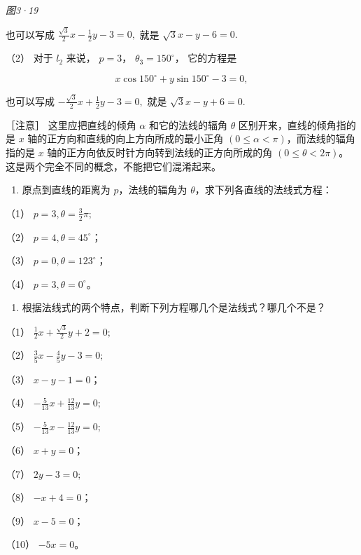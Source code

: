 \emph{图3·19}

也可以写成 \(\frac{\sqrt{3}}{2} x - \frac{1}{2} y - 3 = 0,\) 就是
\(\sqrt{3} x - y - 6 = 0.\)

（2） 对于 \(l_{2}\) 来说， \(p = 3\)， \(\theta_{3} = 150^{\circ}\)，
它的方程是

\[
x \cos 150^{\circ} + y \sin 150^{\circ} - 3 = 0,
\]

也可以写成 \(-\frac{\sqrt{3}}{2} x + \frac{1}{2} y - 3 = 0,\) 就是
\(\sqrt{3} x - y + 6 = 0.\)

［注意］ 这里应把直线的倾角 \(\alpha\) 和它的法线的辐角 \(\theta\)
区别开来，直线的倾角指的是 \(x\)
轴的正方向和直线的向上方向所成的最小正角
\((0 \leqslant \alpha < \pi)\)，而法线的辐角指的是 \(x\)
轴的正方向依反时针方向转到法线的正方向所成的角
\((0 \leqslant \theta < 2\pi)\)。这是两个完全不同的概念，不能把它们混淆起来。

\begin{enumerate}
\def\labelenumi{\arabic{enumi}.}
\tightlist
\item
  原点到直线的距离为 \(p\)，法线的辐角为
  \(\theta\)，求下列各直线的法线式方程：
\end{enumerate}

（1） \(p = 3, \theta = \frac{3}{2}\pi;\)

（2） \(p = 4, \theta = 45^{\circ}\)；

（3） \(p = 0, \theta = 123^{\circ}\)；

（4） \(p = 3, \theta = 0^{\circ}\)。

\begin{enumerate}
\def\labelenumi{\arabic{enumi}.}
\setcounter{enumi}{1}
\tightlist
\item
  根据法线式的两个特点，判断下列方程哪几个是法线式？哪几个不是？
\end{enumerate}

（1） \(\frac{1}{2} x + \frac{\sqrt{3}}{2} y + 2 = 0;\)

（2） \(\frac{3}{5} x - \frac{4}{5} y - 3 = 0;\)

（3） \(x - y - 1 = 0\)；

（4） \(-\frac{5}{13} x + \frac{12}{13} y = 0;\)

（5） \(-\frac{5}{13} x - \frac{12}{13} y = 0;\)

（6） \(x + y = 0\)；

（7） \(2y - 3 = 0;\)

（8） \(-x + 4 = 0\)；

（9） \(x - 5 = 0\)；

（10） \(-5x = 0\)。


